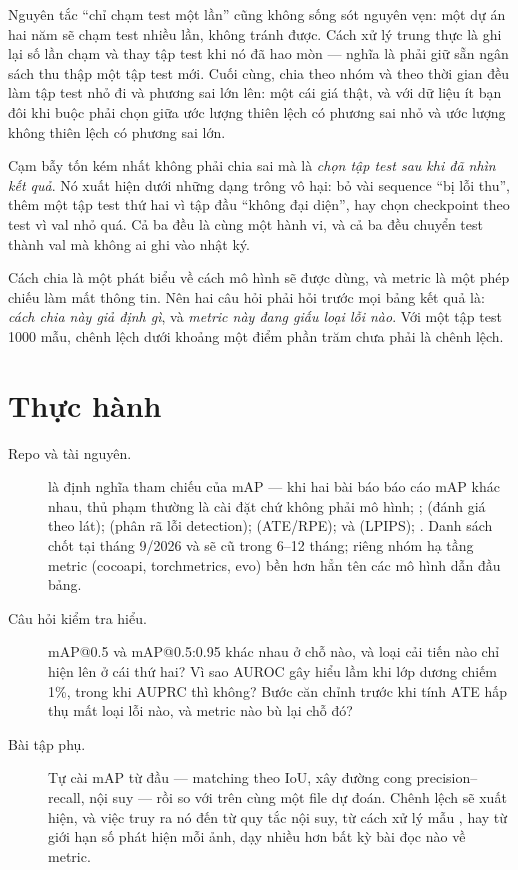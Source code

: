 \documentclass[../../deep_learning.tex]{subfiles}
\begin{document}
Nguyên tắc ``chỉ chạm test một lần'' cũng không sống sót nguyên vẹn: một dự án hai năm sẽ chạm test nhiều lần, không tránh được. Cách xử lý trung thực là ghi lại số lần chạm và thay tập test khi nó đã hao mòn --- nghĩa là phải giữ sẵn ngân sách thu thập một tập test mới. Cuối cùng, chia theo nhóm và theo thời gian đều làm tập test nhỏ đi và phương sai lớn lên: một cái giá thật, và với dữ liệu ít bạn đôi khi buộc phải chọn giữa ước lượng thiên lệch có phương sai nhỏ và ước lượng không thiên lệch có phương sai lớn.

\begin{cambay}
Cạm bẫy tốn kém nhất không phải chia sai mà là \emph{chọn tập test sau khi đã nhìn kết quả}. Nó xuất hiện dưới những dạng trông vô hại: bỏ vài sequence ``bị lỗi thu'', thêm một tập test thứ hai vì tập đầu ``không đại diện'', hay chọn checkpoint theo test vì val nhỏ quá. Cả ba đều là cùng một hành vi, và cả ba đều chuyển test thành val mà không ai ghi vào nhật ký.
\end{cambay}

\begin{cannho}
Cách chia là một phát biểu về cách mô hình sẽ được dùng, và metric là một phép chiếu làm mất thông tin. Nên hai câu hỏi phải hỏi trước mọi bảng kết quả là: \emph{cách chia này giả định gì}, và \emph{metric này đang giấu loại lỗi nào}. Với một tập test 1000 mẫu, chênh lệch dưới khoảng một điểm phần trăm chưa phải là chênh lệch. 
\end{cannho}

\section{Thực hành}
\begin{description}
\item[Repo và tài nguyên.]  là định nghĩa tham chiếu của mAP --- khi hai bài báo báo cáo mAP khác nhau, thủ phạm thường là cài đặt chứ không phải mô hình; ;  (đánh giá theo lát);  (phân rã lỗi detection);  (ATE/RPE);  và  (LPIPS); . Danh sách chốt tại tháng 9/2026 và sẽ cũ trong 6--12 tháng; riêng nhóm hạ tầng metric (cocoapi, torchmetrics, evo) bền hơn hẳn tên các mô hình dẫn đầu bảng.
\item[Câu hỏi kiểm tra hiểu.] mAP@0.5 và mAP@0.5:0.95 khác nhau ở chỗ nào, và loại cải tiến nào chỉ hiện lên ở cái thứ hai? Vì sao AUROC gây hiểu lầm khi lớp dương chiếm 1\%, trong khi AUPRC thì không? Bước căn chỉnh trước khi tính ATE hấp thụ mất loại lỗi nào, và metric nào bù lại chỗ đó?
\item[Bài tập phụ.] Tự cài mAP từ đầu --- matching theo IoU, xây đường cong precision--recall, nội suy --- rồi so với  trên cùng một file dự đoán. Chênh lệch sẽ xuất hiện, và việc truy ra nó đến từ quy tắc nội suy, từ cách xử lý mẫu , hay từ giới hạn số phát hiện mỗi ảnh, dạy nhiều hơn bất kỳ bài đọc nào về metric.
\end{description}
\end{document}
